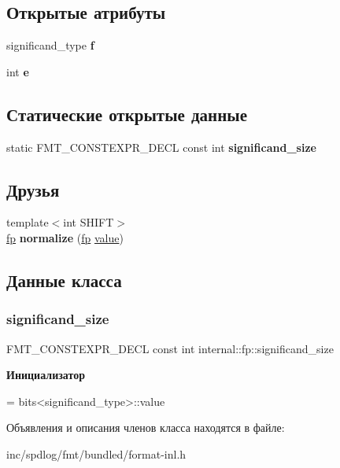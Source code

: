 \subsection*{Открытые атрибуты}
\begin{DoxyCompactItemize}
\item 
\mbox{\label{classinternal_1_1fp_a7e1a8d0bebdf6d95582c035034484ab4}} 
significand\+\_\+type {\bfseries f}
\item 
\mbox{\label{classinternal_1_1fp_aa68580ec0db366075ec0366dc7a74a34}} 
int {\bfseries e}
\end{DoxyCompactItemize}
\subsection*{Статические открытые данные}
\begin{DoxyCompactItemize}
\item 
static F\+M\+T\+\_\+\+C\+O\+N\+S\+T\+E\+X\+P\+R\+\_\+\+D\+E\+CL const int {\bfseries significand\+\_\+size}
\end{DoxyCompactItemize}
\subsection*{Друзья}
\begin{DoxyCompactItemize}
\item 
\mbox{\label{classinternal_1_1fp_a61a05e3b6143d1b04351f1204a2555d0}} 
{\footnotesize template$<$int S\+H\+I\+FT$>$ }\\\hyperlink{classinternal_1_1fp}{fp} {\bfseries normalize} (\hyperlink{classinternal_1_1fp}{fp} \hyperlink{classinternal_1_1value}{value})
\end{DoxyCompactItemize}


\subsection{Данные класса}
\mbox{\label{classinternal_1_1fp_a226e27a91febae6a2d1d1501003be2f9}} 
\subsubsection{\texorpdfstring{significand\+\_\+size}{significand\_size}}
{\footnotesize\ttfamily F\+M\+T\+\_\+\+C\+O\+N\+S\+T\+E\+X\+P\+R\+\_\+\+D\+E\+CL const int internal\+::fp\+::significand\+\_\+size\hspace{0.3cm}{\ttfamily [static]}}

{\bfseries Инициализатор}
\begin{DoxyCode}
=
      bits<significand\_type>::value
\end{DoxyCode}


Объявления и описания членов класса находятся в файле\+:\begin{DoxyCompactItemize}
\item 
inc/spdlog/fmt/bundled/format-\/inl.\+h\end{DoxyCompactItemize}
